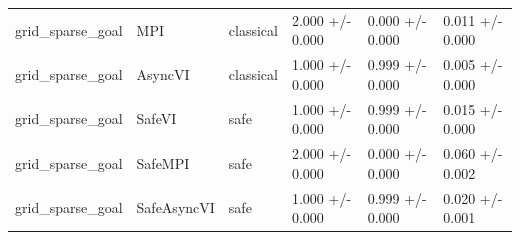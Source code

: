 \begin{tabular}{llllll}
grid_sparse_goal & MPI & classical & 2.000 +/- 0.000 & 0.000 +/- 0.000 & 0.011 +/- 0.000 \\
grid_sparse_goal & AsyncVI & classical & 1.000 +/- 0.000 & 0.999 +/- 0.000 & 0.005 +/- 0.000 \\
grid_sparse_goal & SafeVI & safe & 1.000 +/- 0.000 & 0.999 +/- 0.000 & 0.015 +/- 0.000 \\
grid_sparse_goal & SafeMPI & safe & 2.000 +/- 0.000 & 0.000 +/- 0.000 & 0.060 +/- 0.002 \\
grid_sparse_goal & SafeAsyncVI & safe & 1.000 +/- 0.000 & 0.999 +/- 0.000 & 0.020 +/- 0.001 \\
\bottomrule
\end{tabular}
